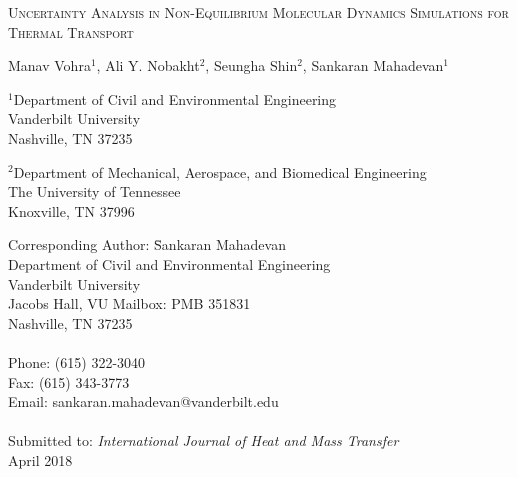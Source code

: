 \begin{center}
\textsc{
Uncertainty Analysis in Non-Equilibrium Molecular Dynamics Simulations for
Thermal Transport
}

\bigskip 
\bigskip 

Manav Vohra$^{1}$, Ali Y. Nobakht$^{2}$, Seungha Shin$^{2}$, Sankaran Mahadevan$^{1}$

\bigskip
\bigskip

\normalsize
$^1$Department of Civil and Environmental Engineering\\
Vanderbilt University\\
Nashville, TN 37235\\

\bigskip

$^2$Department of Mechanical, Aerospace, and Biomedical Engineering\\
The University of Tennessee\\
Knoxville, TN 37996\\

\bigskip

\end{center}

\vspace{6cm}

\begin{tabbing}
Corresponding Author: \hspace{5mm} \= Sankaran Mahadevan\\
       \>  Department of Civil and Environmental Engineering\\
       \>  Vanderbilt University\\
        Jacobs Hall, VU Mailbox: PMB 351831 \\
       \>  Nashville, TN 37235 \\
       \> \\
Phone: \> (615) 322-3040 \\
Fax:   \> (615) 343-3773 \\
Email: \>  sankaran.mahadevan@vanderbilt.edu   \\
\\
Submitted to: \> \textit{International Journal of Heat and Mass Transfer} \\
\>  April 2018\\

\bigskip
\end{tabbing}

\clearpage

